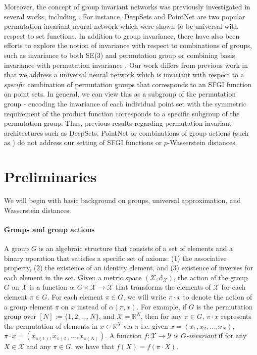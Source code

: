 \documentclass[12pt]{article}
\newcommand{\R}{\mathbb R}
\newcommand{\SFGI} {{SFGI}}
\begin{document}
Moreover, the concept of group invariant networks was previously investigated in several works, including \citep{zaheer2017deep, qi2017pointnet, maron2018invariant, lim2022sign, deng2021vector}. 
For instance, DeepSets \citep{zaheer2017deep} and PointNet \citep{maron2018invariant} are two popular permutation invariant neural network which were shown to be universal with respect to set functions. 
In addition to group invariance, there have also been efforts to explore the notion of invariance with respect to combinations of groups, such as invariance to both SE(3) and permutation group \citep{du2022se, maron2020learning} or combining basis invariance with permutation invariance \citep{lim2022sign}.
Our work differs from previous work in that we address a universal neural network which is invariant with respect to a \textit{specific} combination of permutation groups that corresponds to an \SFGI{} function on point sets. 
In general, we can view this as a subgroup of the permutation group - encoding the invariance of each individual point set with the symmetric requirement of the product function corresponds to a specific subgroup of the permutation group.
Thus, previous results regarding permutation invariant architectures such as DeepSets, PointNet or combinations of group actions (such as \citep{du2022se}) do not address our setting of \SFGI{} functions or $p$-Wasserstein distances.

\section{Preliminaries}
\label{section:preliminaries}
We will begin with basic background on groups, universal approximation, and Wasserstein distances. 
\paragraph{Groups and group actions}
A group $G$ is an algebraic structure that consists of a set of elements and a binary operation that satisfies a specific set of axioms: (1) the associative property, (2) the existence of an identity element, and (3) existence of inverses for each element in the set. 
Given a metric space $(\mathcal{X}, \mathrm{d}_\mathcal{X})$, the action of the group $G$ on $\mathcal{X}$ is a function $\alpha: G \times \mathcal{X} \to \mathcal{X}$ that transforms the elements of $\mathcal{X}$ for each element $\pi \in G$. 
For each element $\pi \in G$, we will write $\pi \cdot x$ to denote the action of a group element $\pi$ on $x$ instead of $\alpha(\pi, x)$.
For example, if $G$ is the permutation group over $[N]:=\{1, 2, \ldots, N\}$, and $\mathcal{X} = \R^N$, then for any $\pi \in G$, $\pi \cdot x$ represents the permutation of elements in $x\in \R^N$ via $\pi$ i.e. given $x = (x_1, x_2, \dots, x_N)$, $\pi \cdot x = (x_{\pi(1)}, x_{\pi(2)} \dots, x_{\pi(N)})$. 
A function $f: \mathcal{X} \to \mathcal{Y}$ is \emph{$G$-invariant} if for any $X \in \mathcal{X}$ and any $\pi \in G$, we have that $f(X) = f(\pi \cdot X)$.  
\end{document}
